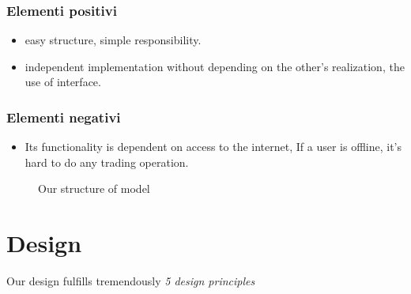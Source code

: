 \documentclass[a4paper,12pt]{report}
\begin{document}
\subsection*{Elementi positivi}
\begin{itemize}
    \item easy structure, simple responsibility.
    \item independent implementation without depending on the other's realization, the use of interface.
\end{itemize}

\subsection*{Elementi negativi}
\begin{itemize}
    \item Its functionality is dependent on access to the internet, If a user is offline, it's hard to do any trading operation.
\end{itemize}


\begin{figure}[H]
\centering{}
%
\caption{Our structure of model}
\label{img:domainAnalysis}
\end{figure}

\chapter{Design}
Our design fulfills tremendously \textit{5 design principles}
\end{document}
